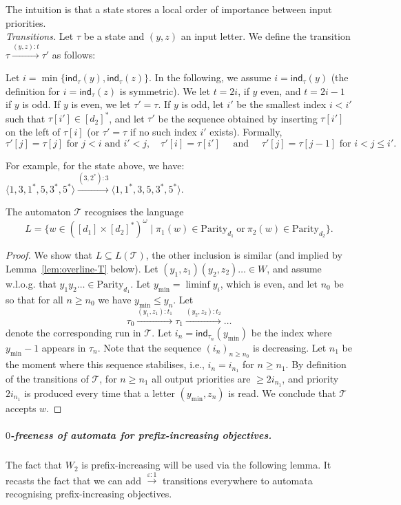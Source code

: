 \documentclass[a4paper,UKenglish,cleveref, thm-restate]{lipics-v2021}
\newcommand{\re}[1]{\xrightarrow{#1}}
\newcommand{\tand}{\text{ and }}
\newcommand{\tfor}{\text{ for }}
\newcommand{\Parity}{\mathrm{Parity}}
\newcommand{\eps}{\varepsilon}
\newcommand{\T}{\mathcal T}
\newcommand{\done}{[d_1]}
\newcommand{\dtwo}{[d_2]^*}
\newcommand{\indtau}[1]{\mathsf{ind}_\tau(#1)}
\newcommand{\indextau}[2]{\mathsf{ind}_{#1}(#2)}
\newcommand{\ymin}{y_{\mathrm{min}}}
\begin{document}
The intuition is that a state stores a local order of importance between input priorities.\\

\textit{Transitions.}
Let $\tau$ be a state and $(y,z)$ an input letter. We define the transition $\tau \re{(y,z):t}\tau'$ as follows:

Let $i = \min \{ \indtau{y}, \indtau{z}\}$. 
In the following, we assume $i = \indtau{y}$ (the definition for $i = \indtau{z}$ is symmetric). 
We let $t = 2i$, if $y$ even, and  $t = 2i-1$ if $y$ is odd.
If $y$ is even, we let $\tau' = \tau$.
If $y$ is odd, let $i'$ be the smallest index $i<i'$ such that $\tau[i']\in \dtwo$, and let $\tau'$ be the sequence obtained by inserting $\tau[i']$ on the left of $\tau[i]$ (or $\tau' = \tau$ if no such index $i'$ exists). 
Formally,
\[ \tau'[j] = \tau[j] \tfor j<i \tand i'<j,  \quad \tau'[i] = \tau[i'] \quad \tand \quad \tau'[j] = \tau[j-1] \tfor i<j\leq i' .\]

For example, for the state above, we have:
$ \langle 1,3,1^*, 5, 3^*, 5^* \rangle  \re{ (3,2^*):3} \langle 1, 1^*, 3, 5, 3^*, 5^* \rangle. $\\
\begin{lemma}\label{lem:language-of-T}
    The automaton $\T$ recognises the language \[L = \{w \in (\done \times \dtwo)^\omega \mid \pi_1(w) \in \Parity_{d_1} \ \mathrm{or} \ \pi_2(w) \in \Parity_{d_2}\}.\]
\end{lemma}
\begin{proof}
    We show that $L\subseteq L(\T)$, the other inclusion is similar (and implied by Lemma~\ref{lem:overline-T} below).
    Let $(y_1,z_1)(y_2,z_2)\dots \in W$, and assume w.l.o.g. that  $y_1y_2\dots \in \Parity_{d_1}$.
    Let $\ymin = \liminf y_i$, which is even, and let $n_0$ be so that for all $n \geq n_0$ we have $\ymin \leq y_n$.
    Let
    \[
        \tau_0 \re{(y_1,z_1):t_1} \tau_1 \re{(y_2,z_2):t_2} \dots
    \]
    denote the corresponding run in $\T$.
    Let $i_n = \indextau{\tau_n}{\ymin}$ be the index where $\ymin-1$ appears in $\tau_n$. 
    Note that the sequence $(i_n)_{n\geq n_0}$ is decreasing. Let $n_1$ be the moment where this sequence stabilises, i.e., $i_n = i_{n_1}$ for $n\geq n_1$.
    By definition of the transitions of $\T$, for $n\geq n_1$ all output priorities are $\geq 2i_{n_1}$, and priority $2i_{n_1}$ is produced every time that a letter $(\ymin, z_n)$ is read.
    We conclude that $\T$ accepts $w$.
\end{proof}


\subparagraph{$0$-freeness of automata for prefix-increasing objectives.} The fact that $W_2$ is prefix-increasing will be used via the following lemma. It recasts the fact that we can add $\re{\eps:1}$ transitions everywhere to automata recognising prefix-increasing objectives.
\end{document}
